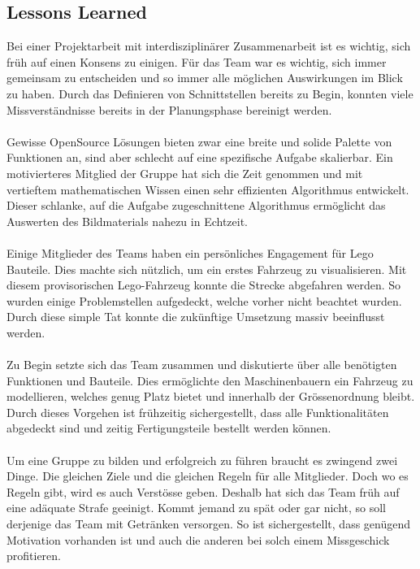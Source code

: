 \subsection{Lessons Learned}

Bei einer Projektarbeit mit interdisziplinärer Zusammenarbeit ist es wichtig, sich früh auf einen Konsens zu einigen.
Für das Team war es wichtig, sich immer gemeinsam zu entscheiden und so immer alle möglichen Auswirkungen im Blick zu haben.
Durch das Definieren von Schnittstellen bereits zu Begin, konnten viele Missverständnisse bereits in der Planungsphase bereinigt werden.
\\
\\
Gewisse OpenSource Lösungen bieten zwar eine breite und solide Palette von Funktionen an, sind aber schlecht auf eine spezifische Aufgabe skalierbar.
Ein motivierteres Mitglied der Gruppe hat sich die Zeit genommen und mit vertieftem mathematischen Wissen einen sehr effizienten Algorithmus entwickelt.
Dieser schlanke, auf die Aufgabe zugeschnittene Algorithmus ermöglicht das Auswerten des Bildmaterials nahezu in Echtzeit.
\\
\\
Einige Mitglieder des Teams haben ein persönliches Engagement für Lego Bauteile. Dies machte sich nützlich, um ein erstes Fahrzeug zu visualisieren.
Mit diesem provisorischen Lego-Fahrzeug konnte die Strecke abgefahren werden. So wurden einige Problemstellen aufgedeckt, welche vorher nicht beachtet wurden. Durch diese simple Tat konnte die zukünftige Umsetzung massiv beeinflusst werden.
\\
\\
Zu Begin setzte sich das Team zusammen und diskutierte über alle benötigten Funktionen und Bauteile.
Dies ermöglichte den Maschinenbauern ein Fahrzeug zu modellieren, welches genug Platz bietet und innerhalb der Grössenordnung bleibt.
Durch dieses Vorgehen ist frühzeitig sichergestellt, dass alle Funktionalitäten abgedeckt sind und zeitig Fertigungsteile bestellt werden können.
\\
\\
Um eine Gruppe zu bilden und erfolgreich zu führen braucht es zwingend zwei Dinge.
Die gleichen Ziele und die gleichen Regeln für alle Mitglieder.
Doch wo es Regeln gibt, wird es auch Verstösse geben. Deshalb hat sich das Team früh auf eine adäquate Strafe geeinigt.
Kommt jemand zu spät oder gar nicht, so soll derjenige das Team mit Getränken versorgen.
So ist sichergestellt, dass genügend Motivation vorhanden ist und auch die anderen bei solch einem Missgeschick profitieren.